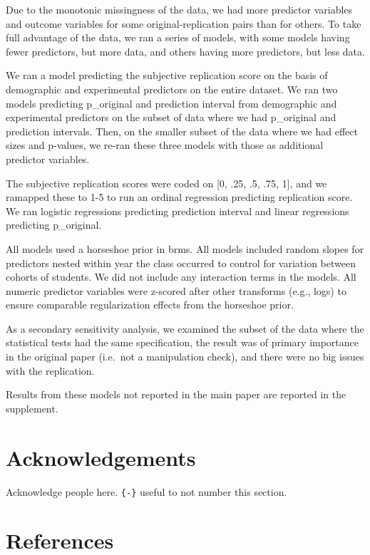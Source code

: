 \documentclass[
  english,
  a4paper,
]{article}
\begin{document}
Due to the monotonic missingness of the data, we had more predictor variables and outcome variables for some original-replication pairs than for others. To take full advantage of the data, we ran a series of models, with some models having fewer predictors, but more data, and others having more predictors, but less data.

We ran a model predicting the subjective replication score on the basis of demographic and experimental predictors on the entire dataset. We ran two models predicting p\_original and prediction interval from demographic and experimental predictors on the subset of data where we had p\_original and prediction intervals. Then, on the smaller subset of the data where we had effect sizes and p-values, we re-ran these three models with those as additional predictor variables.

The subjective replication scores were coded on {[}0, .25, .5, .75, 1{]}, and we ramapped these to 1-5 to run an ordinal regression predicting replication score. We ran logistic regressions predicting prediction interval and linear regressions predicting p\_original.

All models used a horseshoe prior in brms. All models included random slopes for predictors nested within year the class occurred to control for variation between cohorts of students. We did not include any interaction terms in the models. All numeric predictor variables were z-scored after other transforms (e.g., logs) to ensure comparable regularization effects from the horseshoe prior.

As a secondary sensitivity analysis, we examined the subset of the data where the statistical tests had the same specification, the result was of primary importance in the original paper (i.e.~not a manipulation check), and there were no big issues with the replication.

Results from these models not reported in the main paper are reported in the supplement.

\hypertarget{acknowledgements}{%
\section*{Acknowledgements}\label{acknowledgements}}

Acknowledge people here. \texttt{\{-\}} useful to not number this section.

\hypertarget{references}{%
\section*{References}\label{references}}
\end{document}
